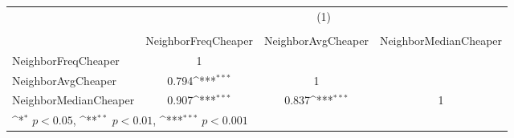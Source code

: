 {
\def\sym#1{\ifmmode^{#1}\else\(^{#1}\)\fi}
\begin{tabular}{l*{3}{c}}
\hline\hline
          &\multicolumn{3}{c}{(1)}                                 \\
          &\multicolumn{3}{c}{}                                    \\
          &NeighborFreqCheaper         &NeighborAvgCheaper         &NeighborMedianCheaper         \\
\hline
NeighborFreqCheaper&        1         &                  &                  \\
NeighborAvgCheaper&    0.794\sym{***}&        1         &                  \\
NeighborMedianCheaper&    0.907\sym{***}&    0.837\sym{***}&        1         \\
\hline\hline
\multicolumn{4}{l}{\footnotesize \sym{*} \(p<0.05\), \sym{**} \(p<0.01\), \sym{***} \(p<0.001\)}\\
\end{tabular}
}
